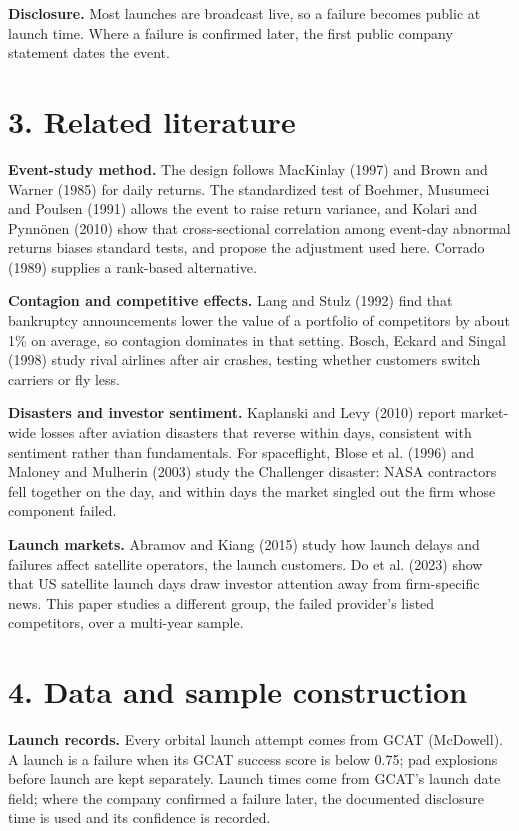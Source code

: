 \documentclass[12pt,a4paper]{article}
\begin{document}
\textbf{Disclosure.} Most launches are broadcast live, so a failure becomes public at launch time. Where a failure is confirmed later, the first public company statement dates the event.

\section*{3. Related literature}
\textbf{Event-study method.} The design follows MacKinlay (1997) and Brown and Warner (1985) for daily returns. The standardized test of Boehmer, Musumeci and Poulsen (1991) allows the event to raise return variance, and Kolari and Pynnönen (2010) show that cross-sectional correlation among event-day abnormal returns biases standard tests, and propose the adjustment used here. Corrado (1989) supplies a rank-based alternative.

\textbf{Contagion and competitive effects.} Lang and Stulz (1992) find that bankruptcy announcements lower the value of a portfolio of competitors by about 1\% on average, so contagion dominates in that setting. Bosch, Eckard and Singal (1998) study rival airlines after air crashes, testing whether customers switch carriers or fly less.

\textbf{Disasters and investor sentiment.} Kaplanski and Levy (2010) report market-wide losses after aviation disasters that reverse within days, consistent with sentiment rather than fundamentals. For spaceflight, Blose et al. (1996) and Maloney and Mulherin (2003) study the Challenger disaster: NASA contractors fell together on the day, and within days the market singled out the firm whose component failed.

\textbf{Launch markets.} Abramov and Kiang (2015) study how launch delays and failures affect satellite operators, the launch customers. Do et al. (2023) show that US satellite launch days draw investor attention away from firm-specific news. This paper studies a different group, the failed provider's listed competitors, over a multi-year sample.

\section*{4. Data and sample construction}
\textbf{Launch records.} Every orbital launch attempt comes from GCAT (McDowell). A launch is a failure when its GCAT success score is below 0.75; pad explosions before launch are kept separately. Launch times come from GCAT's launch date field; where the company confirmed a failure later, the documented disclosure time is used and its confidence is recorded.
\end{document}
